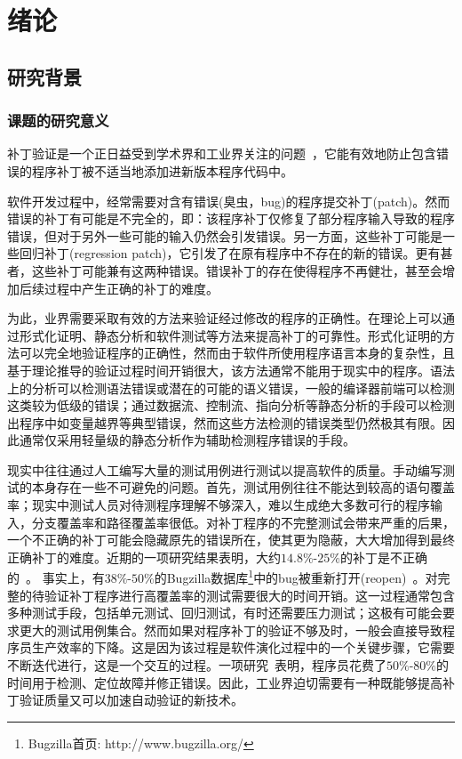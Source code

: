 \chapter{绪论}
\label{chap:intro}

\section{研究背景}
\label{sec:background}

\subsection{课题的研究意义}
\label{sec:meaning}

补丁验证是一个正日益受到学术界和工业界关注的问题~，它能有效地防止包含错误的程序补丁被不适当地添加进新版本程序代码中。

软件开发过程中，经常需要对含有错误(臭虫，bug)的程序提交补丁(patch)。然而错误的补丁有可能是不完全的，即：该程序补丁仅修复了部分程序输入导致的程序错误，但对于另外一些可能的输入仍然会引发错误。另一方面，这些补丁可能是一些回归补丁(regression patch)，它引发了在原有程序中不存在的新的错误。更有甚者，这些补丁可能兼有这两种错误。错误补丁的存在使得程序不再健壮，甚至会增加后续过程中产生正确的补丁的难度。

为此，业界需要采取有效的方法来验证经过修改的程序的正确性。在理论上可以通过形式化证明、静态分析和软件测试等方法来提高补丁的可靠性。形式化证明的方法可以完全地验证程序的正确性，然而由于软件所使用程序语言本身的复杂性，且基于理论推导的验证过程时间开销很大，该方法通常不能用于现实中的程序。语法上的分析可以检测语法错误或潜在的可能的语义错误，一般的编译器前端可以检测这类较为低级的错误；通过数据流、控制流、指向分析等静态分析的手段可以检测出程序中如变量越界等典型错误，然而这些方法检测的错误类型仍然极其有限。因此通常仅采用轻量级的静态分析作为辅助检测程序错误的手段。

现实中往往通过人工编写大量的测试用例进行测试以提高软件的质量。手动编写测试的本身存在一些不可避免的问题。首先，测试用例往往不能达到较高的语句覆盖率；现实中测试人员对待测程序理解不够深入，难以生成绝大多数可行的程序输入，分支覆盖率和路径覆盖率很低。对补丁程序的不完整测试会带来严重的后果，一个不正确的补丁可能会隐藏原先的错误所在，使其更为隐蔽，大大增加得到最终正确补丁的难度。近期的一项研究结果表明，大约$14.8\%$-$25\%$的补丁是不正确的~。 事实上，有$38\%$-$50\%$的Bugzilla数据库\footnote{Bugzilla首页: http://www.bugzilla.org/}中的bug被重新打开(reopen)~。对完整的待验证补丁程序进行高覆盖率的测试需要很大的时间开销。这一过程通常包含多种测试手段，包括单元测试、回归测试，有时还需要压力测试；这极有可能会要求更大的测试用例集合。然而如果对程序补丁的验证不够及时，一般会直接导致程序员生产效率的下降。这是因为该过程是软件演化过程中的一个关键步骤，它需要不断迭代进行，这是一个交互的过程。一项研究~表明，程序员花费了$50\%$-$80\%$的时间用于检测、定位故障并修正错误。因此，工业界迫切需要有一种既能够提高补丁验证质量又可以加速自动验证的新技术。


